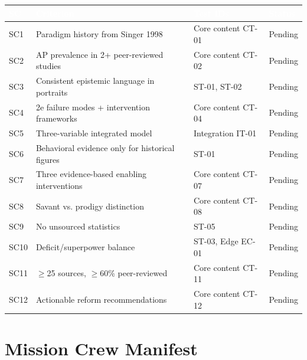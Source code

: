 \documentclass[11pt,letterpaper]{article}
\newcommand{\tableheader}[1]{\textbf{\sffamily\textcolor{white}{#1}}}
\begin{document}
\begin{center}
\begin{tabularx}{\textwidth}{C{1cm}L{4.5cm}L{4cm}C{2cm}}
\toprule
{}
\tableheader{SC} & \tableheader{Criterion} & \tableheader{Test IDs} & \tableheader{Status} \\
\midrule
SC1 & Paradigm history from Singer 1998 & Core content CT-01 & Pending \\
SC2 & AP prevalence in 2+ peer-reviewed studies & Core content CT-02 & Pending \\
SC3 & Consistent epistemic language in portraits & ST-01, ST-02 & Pending \\
SC4 & 2e failure modes + intervention frameworks & Core content CT-04 & Pending \\
SC5 & Three-variable integrated model & Integration IT-01 & Pending \\
SC6 & Behavioral evidence only for historical figures & ST-01 & Pending \\
SC7 & Three evidence-based enabling interventions & Core content CT-07 & Pending \\
SC8 & Savant vs. prodigy distinction & Core content CT-08 & Pending \\
SC9 & No unsourced statistics & ST-05 & Pending \\
SC10 & Deficit/superpower balance & ST-03, Edge EC-01 & Pending \\
SC11 & $\geq$25 sources, $\geq$60\% peer-reviewed & Core content CT-11 & Pending \\
SC12 & Actionable reform recommendations & Core content CT-12 & Pending \\
\bottomrule
\end{tabularx}
\end{center}

\section{Mission Crew Manifest}
\end{document}
